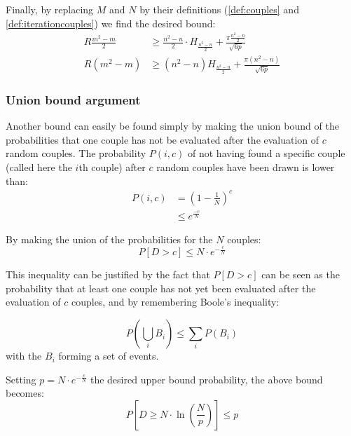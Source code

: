 Finally, by replacing $M$ and $N$ by their definitions (\ref{def:couples} and \ref{def:iterationcouples}) we find the desired bound:
\begin{equation}
    \begin{split}
     R\frac{m^2 -m }{2} & \ge \frac{n^2-n}{2}\cdot H_\frac{n^2-n}{2}  + \frac{\pi \frac{n^2-n}{2}}{\sqrt{6p}} \\
     R(m^2 -m) & \ge (n^2-n) H_\frac{n^2-n}{2} + \frac{\pi (n^2-n)}{\sqrt{6p}}
    \end{split}
    \label{eqn:mr_values_cheb_bound}
\end{equation}

\subsubsection{Union bound argument}
Another bound can easily be found simply by making the union bound of the probabilities that one couple has not be evaluated after the evaluation of $c$ random couples.
The probability $P(i,c)$ of not having found a specific couple (called here the $i$th couple) after $c$ random couples have been drawn is lower than:
\begin{equation}
    \begin{split}
    P(i,c) & = (1-\frac{1}{N})^c \\
    & \le e^{\frac{-c}{N}}
    \end{split}
    \label{eqn:bound_p_for_i}
\end{equation}

By making the union of the probabilities for the $N$ couples:
\begin{equation}
    P[D > c] \le N\cdot e^{-\frac{c}{N}}
\end{equation}

This inequality can be justified by the fact that $P[D > c]$ can be seen as the probability that at least one couple has not yet been evaluated after the evaluation of $c$ couples, and by remembering
Boole's inequality: %

\begin{equation}
    P \left( \mathop{\bigcup}_i B_i \right) \le \sum _i P(B_i)
    \label{eqn:Boole_ineq}
\end{equation}
with the $B_i$ forming a set of events.

Setting $p=N\cdot e^{-\frac{c}{N}}$ the desired upper bound probability, the above bound becomes:
\begin{equation}
    P[D \ge N\cdot \ln (\frac{N}{p})] \le p
\end{equation}

